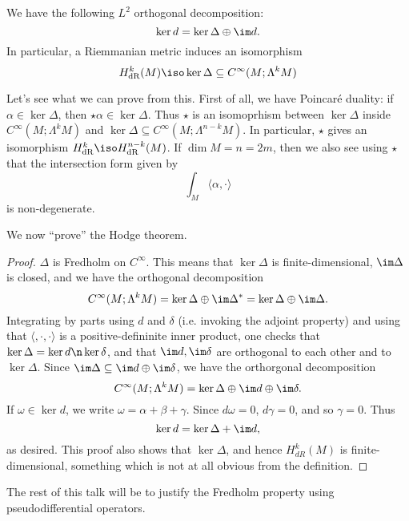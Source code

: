 \documentclass[12pt]{article}
\begin{document}
\begin{thm}[Hodge]We have the following $L^2$ orthogonal decomposition:
\[\ker d = \ker \Delta \oplus \im d.\] In particular, a Riemmanian metric induces an isomorphism
\[H^k_{\text{dR}}(M) \iso \ker \Delta \subseteq C^\infty(M;\Lambda^k M)\]\end{thm}

Let's see what we can prove from this. First of all, we have Poincar\'e duality: if $\alpha \in \ker \Delta$, then $\star\alpha \in \ker \Delta$. Thus $\star$ is an isomoprhism between $\ker \Delta$ inside $C^\infty(M;\Lambda^k M)$ and $\ker \Delta \subseteq C^\infty(M;\Lambda^{n-k} M)$. In particular, $\star$ gives an isomorphism $H^k_{\text{dR}} \iso H^{n-k}_{\text{dR}}(M)$. If $\dim M = n = 2m$, then we also see using $\star$ that the intersection form given by
\[\int_M \langle \alpha,\cdot \rangle\] is non-degenerate. 

We now ``prove'' the Hodge theorem.
\begin{proof}$\Delta$ is Fredholm on $C^\infty$. This means that $\ker \Delta$ is finite-dimensional, $\im \Delta$ is closed, and we have the orthogonal decomposition
\[C^\infty(M;\Lambda^k M) = \ker \Delta \oplus \im \Delta^\ast = \ker \Delta \oplus \im \Delta.\] Integrating by parts using $d$ and $\delta$ (i.e. invoking the adjoint property) and using that $\langle,\cdot,\cdot \rangle$ is a positive-defininite inner product, one checks that $\ker \Delta = \ker d \n \ker \delta$, and that $\im d,\im \delta$ are orthogonal to each other and to $\ker \Delta$. Since $\im \Delta \subseteq \im d\oplus \im \delta$, we have the orthorgonal decomposition
\[C^\infty(M;\Lambda^k M) = \ker \Delta \oplus \im d \oplus \im \delta.\]
If $\omega \in \ker d$, we write $\omega = \alpha+\beta+\gamma$. Since $d\omega = 0$, $d\gamma = 0$, and so $\gamma = 0$. Thus
\[\ker d = \ker \Delta + \im d,\] as desired. This proof also shows that $\ker \Delta$, and hence $H^k_{dR}(M)$ is finite-dimensional, something which is not at all obvious from the definition.\end{proof}

The rest of this talk will be to justify the Fredholm property using pseudodifferential operators.
\end{document}
